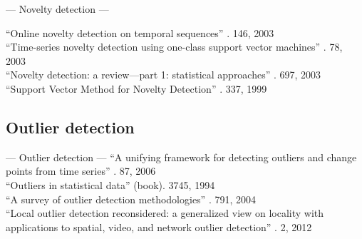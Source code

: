 --- Novelty detection ---

``Online novelty detection on temporal sequences'' \cite{ma2003online}. 146, 2003 \\
``Time-series novelty detection using one-class support vector machines'' \cite{ma2003time}. 78, 2003 \\

``Novelty detection: a review—part 1: statistical approaches'' \cite{markou2003novelty}. 697, 2003 \\

``Support Vector Method for Novelty Detection'' \cite{scholkopf1999support}. 337, 1999 \\

\subsection{Outlier detection}\label{subsec:outlier_detection}

--- Outlier detection ---
``A unifying framework for detecting outliers and change points from time series'' \cite{takeuchi2006unifying}. 87, 2006 \\

``Outliers in statistical data'' \cite{barnett1994outliers} (book). 3745, 1994 \\

``A survey of outlier detection methodologies'' \cite{hodge2004survey}. 791, 2004 \\

``Local outlier detection reconsidered: a generalized view on locality with applications to spatial, video, and network outlier detection'' \cite{schubert2012local}. 2, 2012 \\








